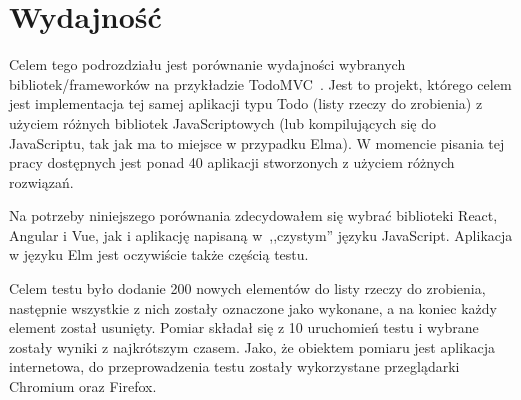 \documentclass[twoside,a4paper]{report}
\begin{document}
\section{Wydajność}
Celem tego podrozdziału jest porównanie wydajności wybranych bibliotek/frameworków na przykładzie TodoMVC~\cite{todomvc}.
Jest to projekt, którego celem jest implementacja tej samej aplikacji typu Todo (listy rzeczy do zrobienia) z użyciem różnych bibliotek JavaScriptowych (lub kompilujących się do JavaScriptu, tak jak ma to miejsce w przypadku Elma).
W momencie pisania tej pracy dostępnych jest ponad 40 aplikacji stworzonych z użyciem różnych rozwiązań.

Na potrzeby niniejszego porównania zdecydowałem się wybrać biblioteki React, Angular i Vue, jak i aplikację napisaną w~,,czystym'' języku JavaScript.
Aplikacja w języku Elm jest oczywiście także częścią testu.

Celem testu było dodanie 200 nowych elementów do listy rzeczy do zrobienia, następnie wszystkie z nich zostały oznaczone jako wykonane, a na koniec każdy element został usunięty.
Pomiar składał się z 10 uruchomień testu i wybrane zostały wyniki z najkrótszym czasem.
Jako, że obiektem pomiaru jest aplikacja internetowa, do przeprowadzenia testu zostały wykorzystane przeglądarki Chromium oraz Firefox.
\end{document}

